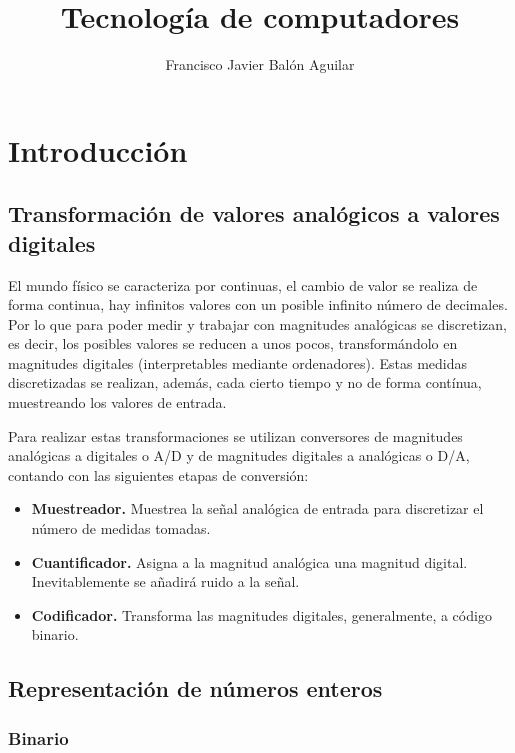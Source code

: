 \documentclass[a4paper, 11pt, titlepage]{article}
\title{Tecnología de computadores}
\author{Francisco Javier Balón Aguilar}
\begin{document}
\maketitle
\renewcommand{\contentsname}{Índice}
\tableofcontents
\newpage

\section{Introducción}

    \subsection{Transformación de valores analógicos a valores digitales}

        El mundo físico se caracteriza por continuas, el cambio de valor se realiza de forma continua, hay infinitos 
        valores con un posible infinito número de decimales. Por lo que para poder medir y trabajar con magnitudes 
        analógicas se discretizan, es decir, los posibles valores se reducen a unos pocos, transformándolo en magnitudes 
        digitales (interpretables mediante ordenadores). Estas medidas discretizadas se realizan, además, cada cierto 
        tiempo y no de forma contínua, muestreando los valores de entrada.

        Para realizar estas transformaciones se utilizan conversores de magnitudes analógicas a digitales o A/D y de 
        magnitudes digitales a analógicas o D/A, contando con las siguientes etapas de conversión:

        \begin{itemize}
            \item \textbf{Muestreador.} Muestrea la señal analógica de entrada para discretizar el número de medidas 
            tomadas.
            \item \textbf{Cuantificador.} Asigna a la magnitud analógica una magnitud digital. Inevitablemente se 
            añadirá ruido a la señal.
            \item \textbf{Codificador.} Transforma las magnitudes digitales, generalmente, a código binario.
        \end{itemize}

    \subsection{Representación de números enteros}

        \subsubsection{Binario}
\end{document}
